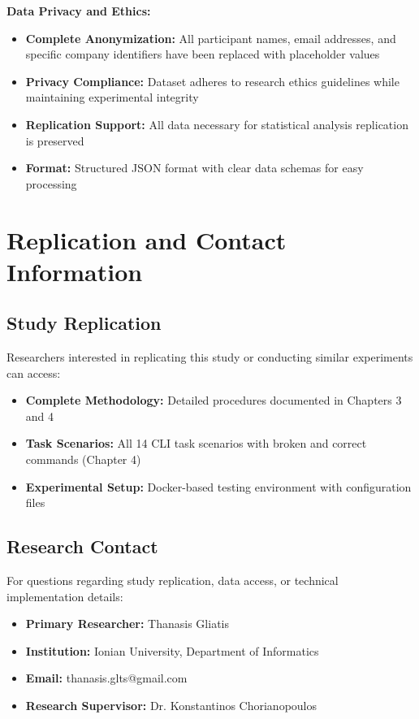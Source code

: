 \textbf{Data Privacy and Ethics:}
\begin{itemize}
	\item \textbf{Complete Anonymization:} All participant names, email addresses, and specific company identifiers have been replaced with placeholder values
	\item \textbf{Privacy Compliance:} Dataset adheres to research ethics guidelines while maintaining experimental integrity
	\item \textbf{Replication Support:} All data necessary for statistical analysis replication is preserved
	\item \textbf{Format:} Structured JSON format with clear data schemas for easy processing
\end{itemize}

\section{Replication and Contact Information}

\subsection{Study Replication}
Researchers interested in replicating this study or conducting similar experiments can access:

\begin{itemize}
	\item \textbf{Complete Methodology:} Detailed procedures documented in Chapters 3 and 4
	\item \textbf{Task Scenarios:} All 14 CLI task scenarios with broken and correct commands (Chapter 4)
	\item \textbf{Experimental Setup:} Docker-based testing environment with configuration files
\end{itemize}

\subsection{Research Contact}
For questions regarding study replication, data access, or technical implementation details:

\begin{itemize}
	\item \textbf{Primary Researcher:} Thanasis Gliatis
	\item \textbf{Institution:} Ionian University, Department of Informatics
	\item \textbf{Email:} thanasis.glts@gmail.com
	\item \textbf{Research Supervisor:} Dr. Konstantinos Chorianopoulos
\end{itemize}

